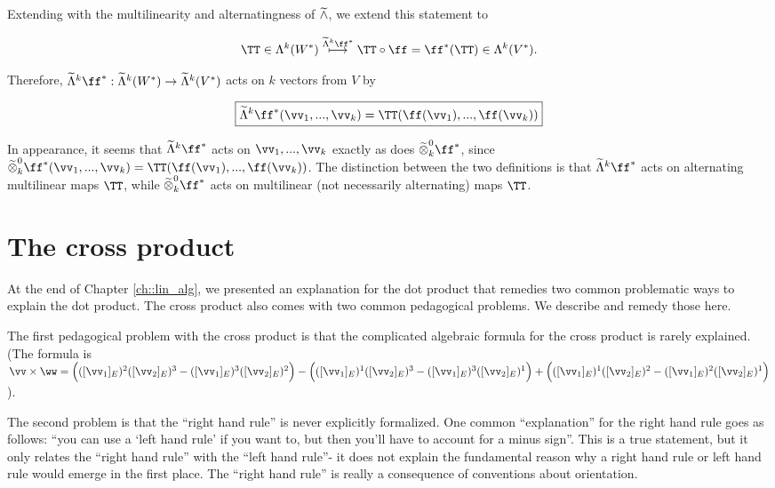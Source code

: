 \begin{deriv}
    Extending with the multilinearity and alternatingness of $\widetilde{\wedge}$, we extend this statement to
    
    \begin{align*}
        \TT \in \Lambda^k(W^*) \overset{\tLambda^k \ff^*}{\longmapsto} \TT \circ \ff = \ff^*(\TT) \in \Lambda^k(V^*).
    \end{align*}
    
    Therefore, $\tLambda^k \ff^*:\tLambda^k(W^*) \rightarrow \tLambda^k(V^*)$ acts on $k$ vectors from $V$ by
    
    \begin{align*}
        \boxed
        {
            \tLambda^k \ff^*(\vv_1, ..., \vv_k) = \TT(\ff(\vv_1), ..., \ff(\vv_k))
        }
    \end{align*}
    
    In appearance, it seems that $\tLambda^k \ff^*$ acts on $\vv_1, ..., \vv_k$ exactly as does $\totimes^0_k \ff^*$, since $\totimes^0_k \ff^*(\vv_1, ..., \vv_k) = \TT(\ff(\vv_1), ..., \ff(\vv_k))$. The distinction between the two definitions is that $\tLambda^k \ff^*$ acts on alternating multilinear maps $\TT$, while $\totimes^0_k \ff^*$ acts on multilinear (not necessarily alternating) maps $\TT$.
\end{deriv}

\newpage

\section{The cross product}
\label{ch::exterior_pwrs::section::cross_product}

At the end of Chapter \ref{ch::lin_alg}, we presented an explanation for the dot product that remedies two common problematic ways to explain the dot product. The cross product also comes with two common pedagogical problems. We describe and remedy those here.

The first pedagogical problem with the cross product is that the complicated algebraic formula for the cross product is rarely explained. (The formula is $\vv \times \ww = \Big( ([\vv_1]_E)^2 ([\vv_2]_E)^3 - ([\vv_1]_E)^3 ([\vv_2]_E)^2 \Big) - \Big( ([\vv_1]_E)^1 ([\vv_2]_E)^3 - ([\vv_1]_E)^3 ([\vv_2]_E)^1 \Big) + \Big( ([\vv_1]_E)^1 ([\vv_2]_E)^2 - ([\vv_1]_E)^2 ([\vv_2]_E)^1 \Big)$).

The second problem is that the ``right hand rule'' is never explicitly formalized. One common ``explanation'' for the right hand rule goes as follows: ``you can use a `left hand rule' if you want to, but then you'll have to account for a minus sign''. This is a true statement, but it only relates the ``right hand rule'' with the ``left hand rule''- it does not explain the fundamental reason why a right hand rule or left hand rule would emerge in the first place. The ``right hand rule'' is really a consequence of conventions about orientation.

